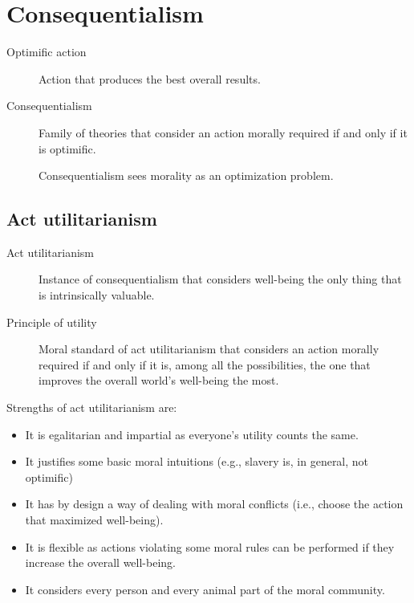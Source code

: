 \section{Consequentialism}

\begin{description}
    \item[Optimific action] 
        Action that produces the best overall results.

    \item[Consequentialism] 
        Family of theories that consider an action morally required if and only if it is optimific.

        \begin{remark}
            Consequentialism sees morality as an optimization problem.
        \end{remark}
\end{description}


\subsection{Act utilitarianism}

\begin{description}
    \item[Act utilitarianism] 
        Instance of consequentialism that considers well-being the only thing that is intrinsically valuable.

    \item[Principle of utility] 
        Moral standard of act utilitarianism that considers an action morally required if and only if it is, among all the possibilities, the one that improves the overall world's well-being the most.
\end{description}

\begin{remark}
    Strengths of act utilitarianism are:
    \begin{itemize}
        \item It is egalitarian and impartial as everyone's utility counts the same.
        \item It justifies some basic moral intuitions (e.g., slavery is, in general, not optimific)
        \item It has by design a way of dealing with moral conflicts (i.e., choose the action that maximized well-being).
        \item It is flexible as actions violating some moral rules can be performed if they increase the overall well-being.
        \item It considers every person and every animal part of the moral community.
    \end{itemize}
\end{remark}

